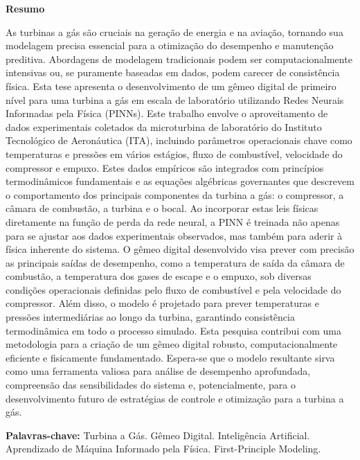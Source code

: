 \documentclass[
  12pt,
  oneside,
  a4paper,
  english,
  brazil]{abntex2}
\begin{document}
\vspace{2cm}

\newpage{}

\begin{center}
\huge{\textbf{Resumo}}
\end{center}

As turbinas a gás são cruciais na geração de energia e na aviação,
tornando sua modelagem precisa essencial para a otimização do desempenho
e manutenção preditiva. Abordagens de modelagem tradicionais podem ser
computacionalmente intensivas ou, se puramente baseadas em dados, podem
carecer de consistência física. Esta tese apresenta o desenvolvimento de
um gêmeo digital de primeiro nível para uma turbina a gás em escala de
laboratório utilizando Redes Neurais Informadas pela Física (PINNs).
Este trabalho envolve o aproveitamento de dados experimentais coletados
da microturbina de laboratório do Instituto Tecnológico de Aeronáutica
(ITA), incluindo parâmetros operacionais chave como temperaturas e
pressões em vários estágios, fluxo de combustível, velocidade do
compressor e empuxo. Estes dados empíricos são integrados com princípios
termodinâmicos fundamentais e as equações algébricas governantes que
descrevem o comportamento dos principais componentes da turbina a gás: o
compressor, a câmara de combustão, a turbina e o bocal. Ao incorporar
estas leis físicas diretamente na função de perda da rede neural, a PINN
é treinada não apenas para se ajustar aos dados experimentais
observados, mas também para aderir à física inherente do sistema. O
gêmeo digital desenvolvido visa prever com precisão as principais saídas
de desempenho, como a temperatura de saída da câmara de combustão, a
temperatura dos gases de escape e o empuxo, sob diversas condições
operacionais definidas pelo fluxo de combustível e pela velocidade do
compressor. Além disso, o modelo é projetado para prever temperaturas e
pressões intermediárias ao longo da turbina, garantindo consistência
termodinâmica em todo o processo simulado. Esta pesquisa contribui com
uma metodologia para a criação de um gêmeo digital robusto,
computacionalmente eficiente e fisicamente fundamentado. Espera-se que o
modelo resultante sirva como uma ferramenta valiosa para análise de
desempenho aprofundada, compreensão das sensibilidades do sistema e,
potencialmente, para o desenvolvimento futuro de estratégias de controle
e otimização para a turbina a gás.

\vspace{1cm}

\textbf{Palavras-chave: } Turbina a Gás. Gêmeo Digital. Inteligência
Artificial. Aprendizado de Máquina Informado pela Física.
First-Principle Modeling.
\end{document}
